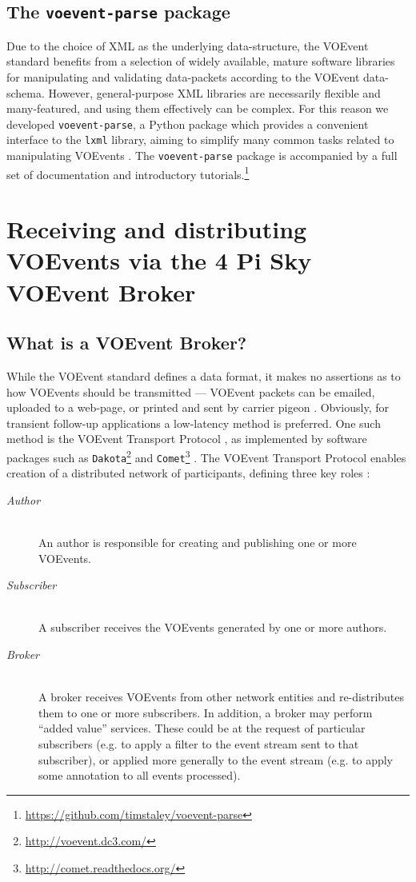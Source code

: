 \documentclass[5p,authoryear]{elsarticle}
\begin{document}
\subsection{The \texttt{voevent-parse} package}
Due to the choice of XML as the underlying data-structure, the VOEvent standard benefits from a selection of widely available, mature software libraries for manipulating and validating data-packets according to the VOEvent data-schema.
However, general-purpose XML libraries are necessarily flexible and many-featured, and using them effectively can be complex. 
For this reason we developed \texttt{voevent-parse}, 
a Python package which provides a convenient interface to the \texttt{lxml} library, aiming to simplify many common tasks related to manipulating VOEvents \citep{Staley2014}. 
The \texttt{voevent-parse} package is accompanied by a full set of documentation and introductory tutorials.\footnote{\url{https://github.com/timstaley/voevent-parse}}

\section{Receiving and distributing VOEvents via the 4 Pi Sky VOEvent Broker}
\subsection{What is a VOEvent Broker?}
While the VOEvent standard defines a data format, it makes no assertions as to how VOEvents should be transmitted --- VOEvent packets can be emailed, uploaded to a web-page, or printed and sent by carrier pigeon \citep{Waitzman1990}. 
Obviously, for transient follow-up applications a low-latency method is preferred. 
One such method is the VOEvent Transport Protocol \citep[][]{Allan2016}, as implemented by software packages such as \texttt{Dakota}\footnote{\url{http://voevent.dc3.com/}} \citep{Denny2010} and \texttt{Comet}\footnote{\url{http://comet.readthedocs.org/}} \citep{Swinbank2014}. 
The VOEvent Transport Protocol enables creation of a distributed network of participants, defining three key roles \citep[cf][]{Swinbank2014}:
\begin{description}
  \item[\textit{Author}] \hfill \\
    An author is responsible for creating and publishing one or more VOEvents.
    \item[\textit{Subscriber}] \hfill \\
    A subscriber receives the VOEvents generated by one or more authors.
    \item[\textit{Broker}] \hfill \\
    A broker receives VOEvents from other network entities and re-distributes them to one or more subscribers. In addition, a broker may perform “added value” services. These could be at the request of particular subscribers (e.g. to apply a filter to the event stream sent to that subscriber), or applied more generally to the event stream (e.g. to apply some annotation to all events processed).
\end{description}
\end{document}
